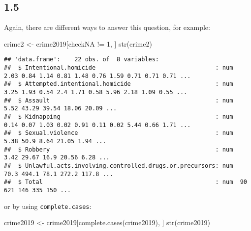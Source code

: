 \documentclass[
]{article}
\newenvironment{Shaded}{\begin{snugshade}}{\end{snugshade}}
\newcommand{\DecValTok}[1]{\textcolor[rgb]{0.00,0.00,0.81}{#1}}
\newcommand{\FunctionTok}[1]{\textcolor[rgb]{0.00,0.00,0.00}{#1}}
\newcommand{\NormalTok}[1]{#1}
\newcommand{\OtherTok}[1]{\textcolor[rgb]{0.56,0.35,0.01}{#1}}
\newcommand{\SpecialCharTok}[1]{\textcolor[rgb]{0.00,0.00,0.00}{#1}}
\begin{document}
\hypertarget{section-4}{%
\subsection{1.5}\label{section-4}}

Again, there are different ways to answer this question, for example:

\begin{Shaded}
\begin{Highlighting}[]
\NormalTok{crime2 }\OtherTok{\textless{}{-}}\NormalTok{ crime2019[checkNA }\SpecialCharTok{!=} \DecValTok{1}\NormalTok{, ]}
\FunctionTok{str}\NormalTok{(crime2)}
\end{Highlighting}
\end{Shaded}

\begin{verbatim}
## 'data.frame':    22 obs. of  8 variables:
##  $ Intentional.homicide                                  : num  2.03 0.84 1.14 0.81 1.48 0.76 1.59 0.71 0.71 0.71 ...
##  $ Attempted.intentional.homicide                        : num  3.25 1.93 0.54 2.4 1.71 0.58 5.96 2.18 1.09 0.55 ...
##  $ Assault                                               : num  5.52 43.29 39.54 18.06 20.09 ...
##  $ Kidnapping                                            : num  0.14 0.07 1.03 0.02 0.91 0.11 0.02 5.44 0.66 1.71 ...
##  $ Sexual.violence                                       : num  5.38 50.9 8.64 21.05 1.94 ...
##  $ Robbery                                               : num  3.42 29.67 16.9 20.56 6.28 ...
##  $ Unlawful.acts.involving.controlled.drugs.or.precursors: num  70.3 494.1 78.1 272.2 117.8 ...
##  $ Total                                                 : num  90 621 146 335 150 ...
\end{verbatim}

or by using \texttt{complete.cases}:

\begin{Shaded}
\begin{Highlighting}[]
\NormalTok{crime2019 }\OtherTok{\textless{}{-}}\NormalTok{ crime2019[}\FunctionTok{complete.cases}\NormalTok{(crime2019), ]}
\FunctionTok{str}\NormalTok{(crime2019)}
\end{Highlighting}
\end{Shaded}
\end{document}
